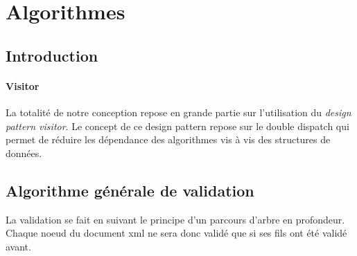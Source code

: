 \section{Algorithmes}

\subsection*{Introduction}
\paragraph{Visitor}
La totalité de notre conception repose en grande partie sur l'utilisation du \textit{design pattern visitor}. Le concept de ce design pattern repose sur le double dispatch qui permet de réduire les dépendance des algorithmes vis à vis des structures de données.\\


\subsection{Algorithme générale de validation}
La validation se fait en suivant le principe d'un parcours d'arbre en profondeur. Chaque noeud du document xml ne sera donc validé que si ses fils ont été validé avant.



